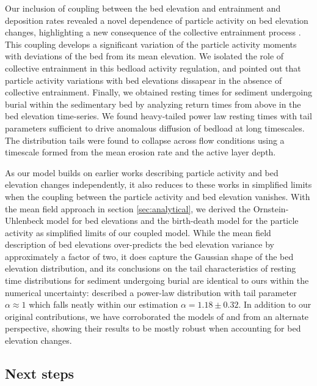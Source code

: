 \documentclass[draft]{agujournal2018}
\begin{document}
Our inclusion of coupling between the bed elevation and entrainment and deposition rates revealed a novel dependence of particle activity on bed elevation changes,  highlighting a new consequence of the collective entrainment process \citep{Ancey2008,Lee2018}. This coupling develops a significant variation of the particle activity moments with deviations of the bed from its mean elevation. We isolated the role of collective entrainment in this bedload activity regulation, and pointed out that particle activity variations with bed elevations dissapear in the absence of collective entrainment.
Finally, we obtained resting times for sediment undergoing burial within the sedimentary bed by analyzing return times from above in the bed elevation time-series. We found heavy-tailed power law resting times with tail parameters sufficient to drive anomalous diffusion of bedload at long timescales.
The distribution tails were found to collapse across flow conditions using a timescale formed from the mean erosion rate and the active layer depth.

As our model builds on earlier works describing particle activity and bed elevation changes independently, it also reduces to these works in simplified limits when the coupling between the particle activity and bed elevation vanishes.
With the mean field approach in section \ref{sec:analytical}, we derived the \citet{Martin2014} Ornstein-Uhlenbeck model for bed elevations and the \citet{Ancey2008} birth-death model for the particle activity as simplified limits of our coupled model. While the mean field description of bed elevations over-predicts the bed elevation variance by approximately a factor of two, it does capture the Gaussian shape of the bed elevation distribution, and its conclusions on the tail characteristics of resting time distributions for sediment undergoing burial are identical to ours within the numerical uncertainty: \citet{Martin2014} described a power-law distribution with tail parameter $\alpha \approx 1$ which falls neatly within our estimation $\alpha = 1.18 \pm 0.32$. In addition to our original contributions, we have corroborated the models of \citet{Ancey2008} and \citet{Martin2014} from an alternate perspective, showing their results to be mostly robust when accounting for bed elevation changes.


\subsection{Next steps}
\end{document}
